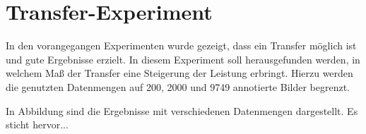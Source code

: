 	\section{Transfer-Experiment}
	\label{sec:todo}
	In den vorangegangen Experimenten wurde gezeigt, dass ein Transfer möglich ist und gute Ergebnisse erzielt. In diesem Experiment soll herausgefunden werden, in welchem Maß der Transfer eine Steigerung der Leistung erbringt. Hierzu werden die genutzten Datenmengen auf 200, 2000 und 9749 annotierte Bilder begrenzt.
	
	In Abbildung  sind die Ergebnisse mit verschiedenen Datenmengen dargestellt. Es sticht hervor... 
	
